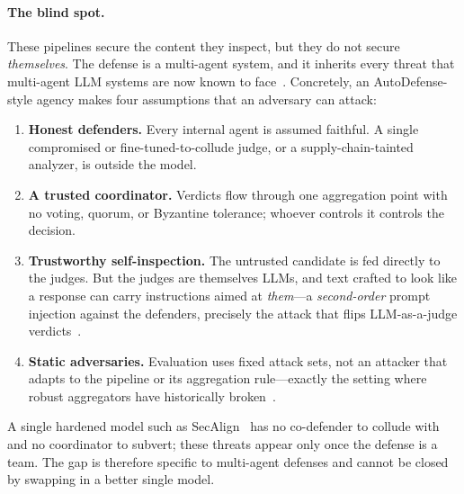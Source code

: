 \paragraph{The blind spot.}
These pipelines secure the content they inspect, but they do not secure
\emph{themselves}. The defense is a multi-agent system, and it inherits every threat
that multi-agent LLM systems are now known to
face~\cite{lee2024promptinfection,tian2023evilgeniuses,ju2024flooding,he2025redteaming,zhang2024psysafe,zhang2024asb}.
Concretely, an AutoDefense-style agency makes four assumptions that an adversary can
attack:
\begin{enumerate}[leftmargin=1.6em,itemsep=2pt,topsep=2pt]
  \item \textbf{Honest defenders.} Every internal agent is assumed faithful. A single
        compromised or fine-tuned-to-collude judge, or a supply-chain-tainted analyzer,
        is outside the model.
  \item \textbf{A trusted coordinator.} Verdicts flow through one aggregation point with
        no voting, quorum, or Byzantine tolerance; whoever controls it controls the
        decision.
  \item \textbf{Trustworthy self-inspection.} The untrusted candidate is fed directly to
        the judges. But the judges are themselves LLMs, and text crafted to look like a
        response can carry instructions aimed at \emph{them}—a \emph{second-order} prompt
        injection against the defenders, precisely the attack that flips
        LLM-as-a-judge verdicts~\cite{shi2024judgeinjection,zheng2023judging,wang2023notfair}.
  \item \textbf{Static adversaries.} Evaluation uses fixed attack sets, not an attacker
        that adapts to the pipeline or its aggregation rule—exactly the setting where
        robust aggregators have historically
        broken~\cite{fang2020poisoning,baruch2019little,xie2019fall}.
\end{enumerate}
A single hardened model such as SecAlign~\cite{chen2025secalign} has no co-defender to
collude with and no coordinator to subvert; these threats appear only once the defense
is a team. The gap is therefore specific to multi-agent defenses and cannot be closed
by swapping in a better single model.

